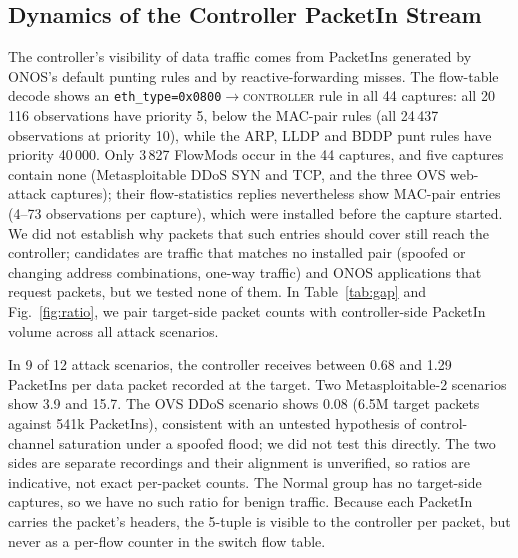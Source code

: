 \documentclass[journal]{IEEEtran}
\begin{document}
\subsection{Dynamics of the Controller PacketIn Stream}
The controller's visibility of data traffic comes from PacketIns generated by ONOS's default punting rules and by reactive-forwarding misses. The flow-table decode shows an \texttt{eth\_type=0x0800}$\rightarrow$\textsc{controller} rule in all 44 captures: all 20\,116 observations have priority 5, below the MAC-pair rules (all 24\,437 observations at priority 10), while the ARP, LLDP and BDDP punt rules have priority 40\,000. Only 3\,827 FlowMods occur in the 44 captures, and five captures contain none (Metasploitable DDoS SYN and TCP, and the three OVS web-attack captures); their flow-statistics replies nevertheless show MAC-pair entries (4--73 observations per capture), which were installed before the capture started. We did not establish why packets that such entries should cover still reach the controller; candidates are traffic that matches no installed pair (spoofed or changing address combinations, one-way traffic) and ONOS applications that request packets, but we tested none of them. In Table~\ref{tab:gap} and Fig.~\ref{fig:ratio}, we pair target-side packet counts with controller-side PacketIn volume across all attack scenarios.

In 9 of 12 attack scenarios, the controller receives between 0.68 and 1.29 PacketIns per data packet recorded at the target. Two Metasploitable-2 scenarios show 3.9 and 15.7. The OVS DDoS scenario shows 0.08 (6.5M target packets against 541k PacketIns), consistent with an untested hypothesis of control-channel saturation under a spoofed flood; we did not test this directly. The two sides are separate recordings and their alignment is unverified, so ratios are indicative, not exact per-packet counts. The Normal group has no target-side captures, so we have no such ratio for benign traffic. Because each PacketIn carries the packet's headers, the 5-tuple is visible to the controller per packet, but never as a per-flow counter in the switch flow table.
\end{document}
